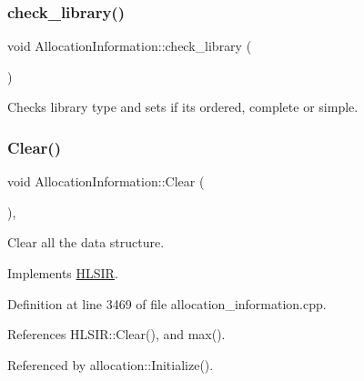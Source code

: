 \subsubsection{\texorpdfstring{check\+\_\+library()}{check\_library()}}
{\footnotesize\ttfamily void Allocation\+Information\+::check\+\_\+library (\begin{DoxyParamCaption}{ }\end{DoxyParamCaption})}



Checks library type and sets if it\textquotesingle{}s ordered, complete or simple. 

\mbox{\label{classAllocationInformation_a2a8dda2a075950424083d9aff01267fe}} 
\subsubsection{\texorpdfstring{Clear()}{Clear()}}
{\footnotesize\ttfamily void Allocation\+Information\+::\+Clear (\begin{DoxyParamCaption}{ }\end{DoxyParamCaption})\hspace{0.3cm}{\ttfamily [override]}, {\ttfamily [virtual]}}



Clear all the data structure. 



Implements \hyperlink{classHLSIR_afba475e313250d56bec388077d032624}{H\+L\+S\+IR}.



Definition at line 3469 of file allocation\+\_\+information.\+cpp.



References H\+L\+S\+I\+R\+::\+Clear(), and max().



Referenced by allocation\+::\+Initialize().

